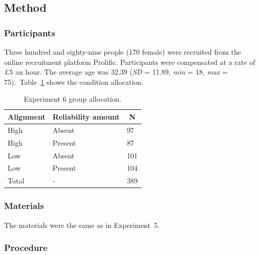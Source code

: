 \documentclass[a4paper, nobind, dvipsnames]{templates/ociamthesis}
\theoremstyle{definition}
\theoremstyle{definition}
\theoremstyle{definition}
\theoremstyle{definition}
\theoremstyle{remark}
\begin{document}
\subsection{Method}

\subsubsection{Participants}

Three hundred and eighty-nine people (170 female) were recruited from the online recruitment platform Prolific. Participants were compensated at a rate of £5 an hour. The average age was 32.39 (\emph{SD} = 11.89, \emph{min} = 18, \emph{max} = 75).~Table~\ref{tab:condition-allocation-alignment-5}
shows the condition allocation.

\begin{table}[tbp]

\begin{center}
\begin{threeparttable}

\caption{\label{tab:condition-allocation-alignment-5}Experiment 6 group allocation.}

\begin{tabular}{lll}
\toprule
Alignment & \multicolumn{1}{c}{Reliability amount} & \multicolumn{1}{c}{N}\\
\midrule
High & Absent & 97\\
High & Present & 87\\
Low & Absent & 101\\
Low & Present & 104\\
Total & - & 389\\
\bottomrule
\end{tabular}

\end{threeparttable}
\end{center}

\end{table}

\subsubsection{Materials}

The materials were the same as in Experiment~5.

\subsubsection{Procedure}
\end{document}
